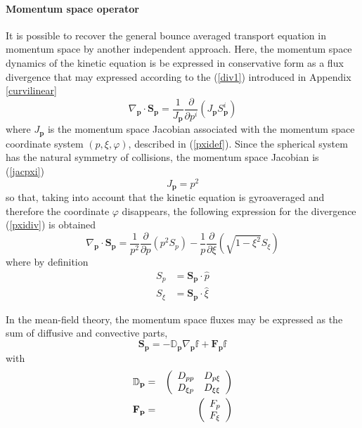 
\paragraph{ Momentum space operator}

It is possible to recover the general bounce averaged transport equation in
momentum space by another independent approach. Here, the momentum space
dynamics of the kinetic equation is be expressed in conservative form as a
flux divergence that may expressed according to the (\ref{div1}) introduced in
Appendix \ref{curvilinear}
\begin{equation}
\nabla_{\mathbf{p}}\cdot\mathbf{S}_{\mathbf{p}}=\frac{1}{J_{\mathbf{p}}}%
\frac{\partial}{\partial p^{i}}\left(  J_{\mathbf{p}}S_{\mathbf{p}}^{i}\right)
\label{divfluxmom}%
\end{equation}
where $J_{\mathbf{p}}$ is the momentum space Jacobian associated with the
momentum space coordinate system $\left(  p,\xi,\varphi\right)  $, described
in (\ref{pxidef}). Since the spherical system has the natural symmetry of
collisions, the momentum space Jacobian is (\ref{jacpxi})
\begin{equation}
J_{\mathbf{p}}=p^{2}%
\end{equation}
so that, taking into account that the kinetic equation is gyroaveraged and
therefore the coordinate $\varphi$ disappears, the following expression for
the divergence (\ref{pxidiv}) is obtained
\begin{equation}
\nabla_{\mathbf{p}}\cdot\mathbf{S}_{\mathbf{p}}=\frac{1}{p^{2}}\frac{\partial
}{\partial p}\left(  p^{2}S_{p}\right)  -\frac{1}{p}\frac{\partial}%
{\partial\xi}\left(  \sqrt{1-\xi^{2}}S_{\xi}\right)
\end{equation}
where by definition
\begin{align}
S_{p}  & =\mathbf{S}_{\mathbf{p}}\cdot\widehat{p}\\
S_{\xi}  & =\mathbf{S}_{\mathbf{p}}\cdot\widehat{\xi}%
\end{align}

In the mean-field theory, the momentum space fluxes may be expressed as the
sum of diffusive and convective parts,
\begin{equation}
\mathbf{S}_{\mathbf{p}}=-\mathbb{{D}_{\mathbf{p}}\nabla_{\mathbf{p}%
}f+\mathbf{F}_{\mathbf{p}}f}\label{momflux2}%
\end{equation}
with
\begin{eqnarray}
\Bbb{D}_{\mathbf{p}} &=&\left(
\begin{array}{ll}
D_{pp} & D_{p\xi } \\
D_{\xi p} & D_{\xi \xi }
\end{array}
\right) \\
\mathbf{F}_{\mathbf{p}} &=&\left(
\begin{array}{l}
F_{p} \\
F_{\xi }
\end{array}
\right)
\end{eqnarray}

